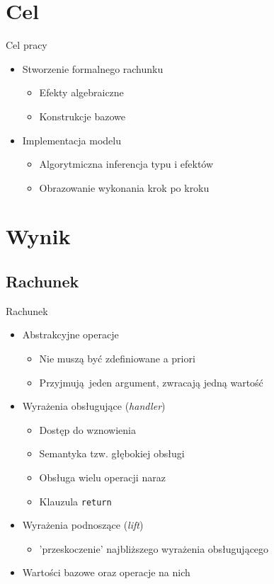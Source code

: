 \documentclass{beamer}
\begin{document}
\section{Cel}
\begin{frame}{Cel pracy}
  \begin{itemize}
    \item Stworzenie formalnego rachunku
    \begin{itemize}
      \item Efekty algebraiczne
      \item Konstrukcje bazowe
    \end{itemize}
    \item Implementacja modelu
    \begin{itemize}
      \item Algorytmiczna inferencja typu i efektów
      \item Obrazowanie wykonania krok po kroku
    \end{itemize}
  \end{itemize}
\end{frame}


\section{Wynik}


\subsection{Rachunek}
\begin{frame}{Rachunek}
  \begin{itemize}
    \item Abstrakcyjne operacje
    \begin{itemize}
      \item Nie muszą być zdefiniowane a priori
      \item Przyjmują jeden argument, zwracają jedną wartość
    \end{itemize}
    \item Wyrażenia obsługujące (\emph{handler})
    \begin{itemize}
      \item Dostęp do wznowienia
      \item Semantyka tzw. głębokiej obsługi
      \item Obsługa wielu operacji naraz
      \item Klauzula \texttt{return}
    \end{itemize}
    \item Wyrażenia podnoszące (\emph{lift})
    \begin{itemize}
      \item 'przeskoczenie' najbliższego wyrażenia obsługującego
    \end{itemize}
    \item Wartości bazowe oraz operacje na nich
  \end{itemize}
\end{frame}
\end{document}
